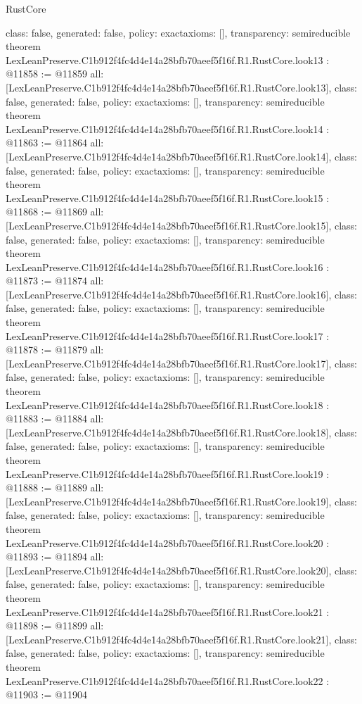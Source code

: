 \begin{lexlean}{RustCore}
\begin{coremodule}
{  class: false,
  generated: false,
  policy: exact{axioms: []},
  transparency: semireducible
}
theorem LexLeanPreserve.C1b912f4fc4d4e14a28bfb70aeef5f16f.R1.RustCore.look13 : @11858 := @11859 {
  all: [LexLeanPreserve.C1b912f4fc4d4e14a28bfb70aeef5f16f.R1.RustCore.look13],
  class: false,
  generated: false,
  policy: exact{axioms: []},
  transparency: semireducible
}
theorem LexLeanPreserve.C1b912f4fc4d4e14a28bfb70aeef5f16f.R1.RustCore.look14 : @11863 := @11864 {
  all: [LexLeanPreserve.C1b912f4fc4d4e14a28bfb70aeef5f16f.R1.RustCore.look14],
  class: false,
  generated: false,
  policy: exact{axioms: []},
  transparency: semireducible
}
theorem LexLeanPreserve.C1b912f4fc4d4e14a28bfb70aeef5f16f.R1.RustCore.look15 : @11868 := @11869 {
  all: [LexLeanPreserve.C1b912f4fc4d4e14a28bfb70aeef5f16f.R1.RustCore.look15],
  class: false,
  generated: false,
  policy: exact{axioms: []},
  transparency: semireducible
}
theorem LexLeanPreserve.C1b912f4fc4d4e14a28bfb70aeef5f16f.R1.RustCore.look16 : @11873 := @11874 {
  all: [LexLeanPreserve.C1b912f4fc4d4e14a28bfb70aeef5f16f.R1.RustCore.look16],
  class: false,
  generated: false,
  policy: exact{axioms: []},
  transparency: semireducible
}
theorem LexLeanPreserve.C1b912f4fc4d4e14a28bfb70aeef5f16f.R1.RustCore.look17 : @11878 := @11879 {
  all: [LexLeanPreserve.C1b912f4fc4d4e14a28bfb70aeef5f16f.R1.RustCore.look17],
  class: false,
  generated: false,
  policy: exact{axioms: []},
  transparency: semireducible
}
theorem LexLeanPreserve.C1b912f4fc4d4e14a28bfb70aeef5f16f.R1.RustCore.look18 : @11883 := @11884 {
  all: [LexLeanPreserve.C1b912f4fc4d4e14a28bfb70aeef5f16f.R1.RustCore.look18],
  class: false,
  generated: false,
  policy: exact{axioms: []},
  transparency: semireducible
}
theorem LexLeanPreserve.C1b912f4fc4d4e14a28bfb70aeef5f16f.R1.RustCore.look19 : @11888 := @11889 {
  all: [LexLeanPreserve.C1b912f4fc4d4e14a28bfb70aeef5f16f.R1.RustCore.look19],
  class: false,
  generated: false,
  policy: exact{axioms: []},
  transparency: semireducible
}
theorem LexLeanPreserve.C1b912f4fc4d4e14a28bfb70aeef5f16f.R1.RustCore.look20 : @11893 := @11894 {
  all: [LexLeanPreserve.C1b912f4fc4d4e14a28bfb70aeef5f16f.R1.RustCore.look20],
  class: false,
  generated: false,
  policy: exact{axioms: []},
  transparency: semireducible
}
theorem LexLeanPreserve.C1b912f4fc4d4e14a28bfb70aeef5f16f.R1.RustCore.look21 : @11898 := @11899 {
  all: [LexLeanPreserve.C1b912f4fc4d4e14a28bfb70aeef5f16f.R1.RustCore.look21],
  class: false,
  generated: false,
  policy: exact{axioms: []},
  transparency: semireducible
}
theorem LexLeanPreserve.C1b912f4fc4d4e14a28bfb70aeef5f16f.R1.RustCore.look22 : @11903 := @11904 {
}
\end{coremodule}
\end{lexlean}
